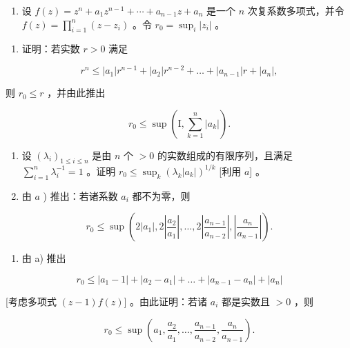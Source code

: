 \ExerciseSection

\begin{enumerate}
\def\labelenumi{\arabic{enumi})}
\tightlist
\item
  设 \(f(z) = z^n + a_1z^{n-1} + \cdots + a_{n-1}z + a_n\) 是一个 \(n\) 次复系数多项式，并令 \(f(z) = \prod_{i=1}^{n}(z - z_i)\) 。令 \(r_0 = \sup_i |z_i|\) 。
\end{enumerate}

\begin{enumerate}
\def\labelenumi{\alph{enumi})}
\tightlist
\item
  证明：若实数 \(r > 0\) 满足
\end{enumerate}

\[
r ^ {n} \leqslant | a _ {1} | r ^ {n - 1} + | a _ {2} | r ^ {n - 2} + \dots + | a _ {n - 1} | r + | a _ {n} |,
\]

则 \(r_0 \leqslant r\) ，并由此推出

\[
r _ {0} \leqslant \sup \left(\mathrm{I}, \sum_ {k = 1} ^ {n} | a _ {k} |\right).
\]

\begin{enumerate}
\def\labelenumi{\alph{enumi})}
\setcounter{enumi}{1}
\item
  设 \((\lambda_i)_{1 \leqslant i \leqslant n}\) 是由 \(n\) 个 \(>0\) 的实数组成的有限序列，且满足 \(\sum_{i=1}^{n} \lambda_i^{-1} = 1\) 。证明 \(r_0 \leqslant \sup_k (\lambda_k |a_k|)^{1/k}\) {[}利用 \(a\){]} 。
\item
  由 \(a\) ) 推出：若诸系数 \(a_i\) 都不为零，则
\end{enumerate}

\[
r _ {0} \leqslant \sup \left(2 | a _ {1} |, 2 \left| \frac {a _ {2}}{a _ {1}} \right|, \dots , 2 \left| \frac {a _ {n - 1}}{a _ {n - 2}} \right|, \left| \frac {a _ {n}}{a _ {n - 1}} \right|\right).
\]

\begin{enumerate}
\def\labelenumi{\alph{enumi})}
\setcounter{enumi}{3}
\tightlist
\item
  由 a) 推出
\end{enumerate}

\[
r _ {0} \leqslant | a _ {1} - 1 | + | a _ {2} - a _ {1} | + \dots + | a _ {n - 1} - a _ {n} | + | a _ {n} |
\]

{[}考虑多项式 \((z - 1)f(z)]\) 。由此证明：若诸 \(a_i\) 都是实数且 \(>0\) ，则

\[
r _ {0} \leqslant \sup \left(a _ {1}, \frac {a _ {2}}{a _ {1}}, \dots , \frac {a _ {n - 1}}{a _ {n - 2}}, \frac {a _ {n}}{a _ {n - 1}}\right).
\]

